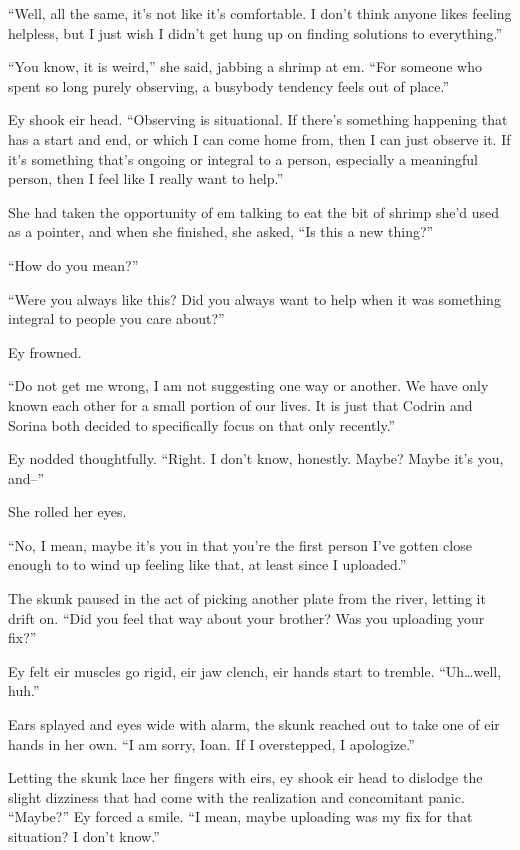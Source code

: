 ``Well, all the same, it's not like it's comfortable. I don't think anyone likes feeling helpless, but I just wish I didn't get hung up on finding solutions to everything.''

``You know, it is weird,'' she said, jabbing a shrimp at em. ``For someone who spent so long purely observing, a busybody tendency feels out of place.''

Ey shook eir head. ``Observing is situational. If there's something happening that has a start and end, or which I can come home from, then I can just observe it. If it's something that's ongoing or integral to a person, especially a meaningful person, then I feel like I really want to help.''

She had taken the opportunity of em talking to eat the bit of shrimp she'd used as a pointer, and when she finished, she asked, ``Is this a new thing?''

``How do you mean?''

``Were you always like this? Did you always want to help when it was something integral to people you care about?''

Ey frowned.

``Do not get me wrong, I am not suggesting one way or another. We have only known each other for a small portion of our lives. It is just that Codrin and Sorina both decided to specifically focus on that only recently.''

Ey nodded thoughtfully. ``Right. I don't know, honestly. Maybe? Maybe it's you, and--''

She rolled her eyes.

``No, I mean, maybe it's you in that you're the first person I've gotten close enough to to wind up feeling like that, at least since I uploaded.''

The skunk paused in the act of picking another plate from the river, letting it drift on. ``Did you feel that way about your brother? Was you uploading your fix?''

Ey felt eir muscles go rigid, eir jaw clench, eir hands start to tremble. ``Uh\ldots well, huh.''

Ears splayed and eyes wide with alarm, the skunk reached out to take one of eir hands in her own. ``I am sorry, Ioan. If I overstepped, I apologize.''

Letting the skunk lace her fingers with eirs, ey shook eir head to dislodge the slight dizziness that had come with the realization and concomitant panic. ``Maybe?'' Ey forced a smile. ``I mean, maybe uploading was my fix for that situation? I don't know.''

